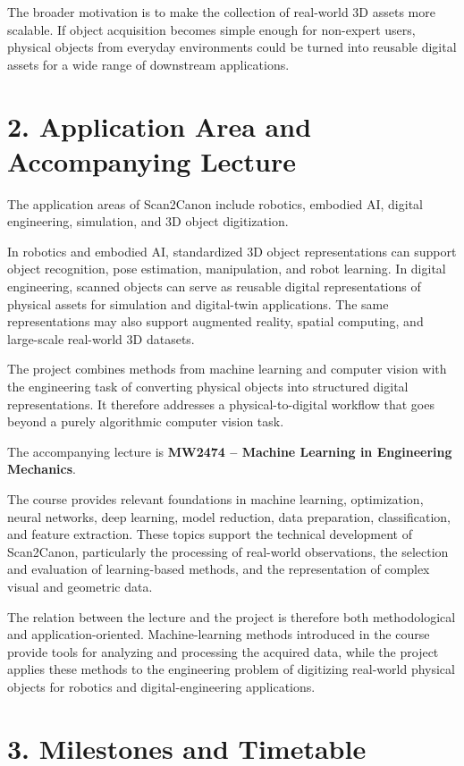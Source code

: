\documentclass[11pt,a4paper]{article}
\begin{document}
The broader motivation is to make the collection of real-world 3D assets more scalable. If object acquisition becomes simple enough for non-expert users, physical objects from everyday environments could be turned into reusable digital assets for a wide range of downstream applications.

\section{2. Application Area and Accompanying Lecture}

The application areas of Scan2Canon include robotics, embodied AI, digital engineering, simulation, and 3D object digitization.

In robotics and embodied AI, standardized 3D object representations can support object recognition, pose estimation, manipulation, and robot learning. In digital engineering, scanned objects can serve as reusable digital representations of physical assets for simulation and digital-twin applications. The same representations may also support augmented reality, spatial computing, and large-scale real-world 3D datasets.

The project combines methods from machine learning and computer vision with the engineering task of converting physical objects into structured digital representations. It therefore addresses a physical-to-digital workflow that goes beyond a purely algorithmic computer vision task.

The accompanying lecture is \textbf{MW2474 -- Machine Learning in Engineering Mechanics}.

The course provides relevant foundations in machine learning, optimization, neural networks, deep learning, model reduction, data preparation, classification, and feature extraction. These topics support the technical development of Scan2Canon, particularly the processing of real-world observations, the selection and evaluation of learning-based methods, and the representation of complex visual and geometric data.

The relation between the lecture and the project is therefore both methodological and application-oriented. Machine-learning methods introduced in the course provide tools for analyzing and processing the acquired data, while the project applies these methods to the engineering problem of digitizing real-world physical objects for robotics and digital-engineering applications.

\section{3. Milestones and Timetable}
\end{document}

